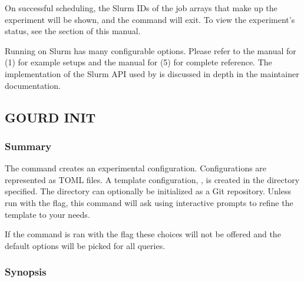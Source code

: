 \documentclass[a4paper,english]{article}
\begin{document}
\begin{adjustwidth}{18pt}{0pt}
\begin{Description}[Subcommands]
                        On successful scheduling, the Slurm IDs of the job arrays that make
                        up the experiment will be shown, and the command will exit.
                        To view the experiment's status, see the   section
                        of this manual.

                        Running on Slurm has many configurable options.
                        Please refer to the manual for (1) for example setups
                        and the manual for (5) for complete reference.
                        The implementation of the Slurm API used by  is discussed
                        in depth in the  maintainer documentation.
                \end{Description}

        \subsection{GOURD INIT}

            \subsubsection{Summary}
                The   command creates an experimental configuration.
                Configurations are represented as TOML files.
                A template configuration, , is created in the directory specified.
                The directory can optionally be initialized as a Git repository.
                Unless run with the  flag, this command will ask using interactive prompts
                to refine the template to your needs.

                If the command is ran with the  flag these choices will not be offered and
                the default options will be picked for all queries.

            \subsubsection{Synopsis}
                 


\end{adjustwidth}
\end{document}
